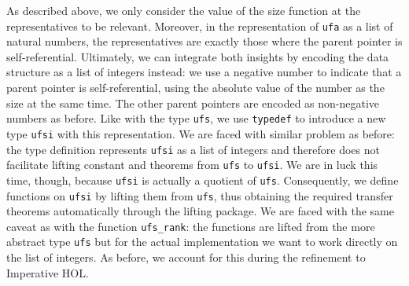 \documentclass[
  sigplan,
  10pt,
  anonymous,
  review,
  ]{acmart}
\begin{document}
As described above, we only consider the value of the size function at the representatives to be relevant.
Moreover, in the representation of \lstinline|ufa| as a list of natural numbers, the representatives are exactly those where the parent pointer is self-referential.
Ultimately, we can integrate both insights by encoding the data structure as a list of integers instead:
we use a negative number to indicate that a parent pointer is self-referential, using the absolute value of the number as the size at the same time.
The other parent pointers are encoded as non-negative numbers as before.
Like with the type \lstinline|ufs|, we use \lstinline|typedef| to introduce a new type \lstinline|ufsi| with this representation.
We are faced with similar problem as before:
the type definition represents \lstinline|ufsi| as a list of integers and therefore does not facilitate lifting constant and theorems from \lstinline|ufs| to \lstinline|ufsi|.
We are in luck this time, though, because \lstinline|ufsi| is actually a quotient of \lstinline|ufs|.
Consequently, we define functions on \lstinline|ufsi| by lifting them from \lstinline|ufs|, thus obtaining the required transfer theorems automatically through the lifting package.
We are faced with the same caveat as with the function \lstinline|ufs_rank|:
the functions are lifted from the more abstract type \lstinline|ufs| but for the actual implementation we want to work directly on the list of integers.
As before, we account for this during the refinement to Imperative HOL.
%
%
%
%
\end{document}
